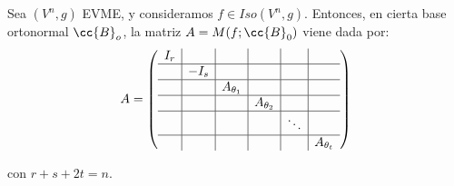 \begin{teo}
    Sea $(V^n,g)$ EVME, y consideramos $f\in Iso(V^n,g)$. Entonces, en cierta base ortonormal $\cc{B}_o$,  la matriz $A=M(f;\cc{B}_0)$ viene dada por:
    \begin{equation*}
        A= \left(\begin{array}{c|c|c|c|c|c}
                I_r &&&&&  \\ \hline
                 & -I_s&&&& \\ \hline
                 && A_{\theta_1}&&& \\ \hline
                 &&& A_{\theta_2}&& \\ \hline
                 &&&&\ddots \\ \hline
                 &&&&& A_{\theta_t}
            \end{array}\right)
    \end{equation*}

    con $r+s+2t=n$.

\end{teo}


